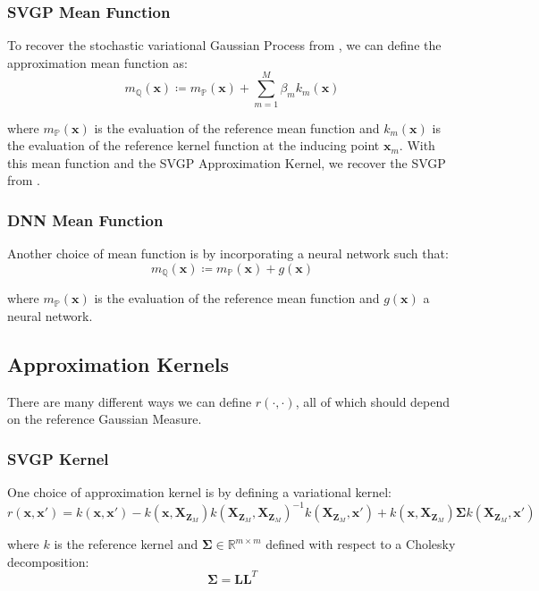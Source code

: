 \documentclass[twoside,11pt]{article}
\begin{document}
\subsubsection{SVGP Mean Function}
To recover the stochastic variational Gaussian Process from \cite{titsias2009variational}, we can define the approximation mean function as:
\[m_{\mathbb{Q}}(\mathbf{x}) \coloneqq m_{\mathbb{P}}(\mathbf{x}) + \sum_{m=1}^{M} \beta_m k_m(\mathbf{x})\]

where $m_{\mathbb{P}}(\mathbf{x})$ is the evaluation of the reference mean function and $k_m(\mathbf{x})$ is the evaluation of the reference kernel function at the inducing point $\mathbf{x}_m$.
With this mean function and the SVGP Approximation Kernel, we recover the SVGP from \cite{titsias2009variational}.

\subsubsection{DNN Mean Function}

Another choice of mean function is by incorporating a neural network such that:
\[m_{\mathbb{Q}}(\mathbf{x}) \coloneqq m_{\mathbb{P}}(\mathbf{x}) + g(\mathbf{x})\]

where $m_{\mathbb{P}}(\mathbf{x})$ is the evaluation of the reference mean function and $g(\mathbf{x})$ a neural network.

\subsection{Approximation Kernels}\label{subsec:approximation-kernels}

There are many different ways we can define $r(\cdot, \cdot)$, all of which should depend on the reference Gaussian Measure.

\subsubsection{SVGP Kernel}

One choice of approximation kernel is by defining a variational kernel:
\[r(\mathbf{x}, \mathbf{x}') = k(\mathbf{x}, \mathbf{x}') - k(\mathbf{x}, \mathbf{X}_{\mathbf{Z}_{M}})k(\mathbf{X}_{\mathbf{Z}_{M}}, \mathbf{X}_{\mathbf{Z}_{M}})^{-1}k(\mathbf{X}_{\mathbf{Z}_{M}}, \mathbf{x}') + k(\mathbf{x}, \mathbf{X}_{\mathbf{Z}_{M}})\mathbf{\Sigma}k(\mathbf{X}_{\mathbf{Z}_{M}}, \mathbf{x}')\]

where $k$ is the reference kernel and $\mathbf{\Sigma} \in \mathbb{R}^{m \times m}$ defined with respect to a Cholesky decomposition:
\[\mathbf{\Sigma} = \mathbf{L}\mathbf{L}^T\]
\end{document}
